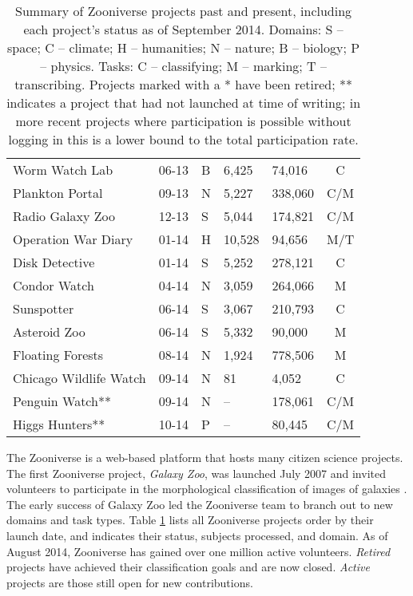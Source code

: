 \documentclass{sigchi}
\begin{document}
\begin{spacing}{0.97}
\begin{spacing}{0.8}
\begin{table}[t]
\begin{center}
\begin{tabular}{p{2.15cm}lp{0.7cm}llc}
Worm Watch Lab & 06-13 & B & 6,425 & 74,016 & C \\	
Plankton Portal & 09-13 & N & 5,227 & 338,060 & C/M \\
Radio Galaxy Zoo & 12-13 & S & 5,044 & 174,821 & C/M \\
\hline
Operation War Diary & 01-14 & H & 10,528 & 94,656 & M/T \\
Disk Detective & 01-14 & S & 5,252 & 278,121 & C \\
Condor Watch & 04-14 & N & 3,059 & 264,066 & M \\
Sunspotter & 06-14 & S & 3,067 & 210,793 & C \\
Asteroid Zoo & 06-14 & S & 5,332 & 90,000 & M \\
Floating Forests & 08-14 & N & 1,924 & 778,506 & M \\
Chicago Wildlife Watch & 09-14 & N & 81 & 4,052 & C \\
Penguin Watch** & 09-14 & N & -- & 178,061 & C/M \\
Higgs Hunters** & 10-14 & P & -- & 80,445 & C/M \\
\hline
\end{tabular}
\caption{Summary of Zooniverse projects past and present, including each project's status as of September 2014. Domains: S -- space; C -- climate; H -- humanities; N -- nature; B -- biology; P -- physics. Tasks: C -- classifying; M -- marking; T -- transcribing. Projects marked with a * have been retired; ** indicates a project that had not launched at time of writing; in more recent projects where participation is possible without logging in this is a lower bound to the total participation rate.}
\label{table:project-summary}
\normalsize
\end{center}
\end{table}
\end{spacing}

The Zooniverse is a web-based platform that hosts many citizen science projects. The first Zooniverse project, \emph{Galaxy Zoo}, was launched July 2007 and invited volunteers to participate in the morphological classification of images of galaxies \cite{lintott2008galaxy,fortson2011galaxy}. The early success of Galaxy Zoo led the Zooniverse team to branch out to new domains and task types. Table \ref{table:project-summary} lists all Zooniverse projects order by their launch date, and indicates their status, subjects processed, and domain. As of August 2014, Zooniverse has gained over one million active volunteers. \emph{Retired} projects have achieved their classification goals and are now closed. \emph{Active} projects are those still open for new contributions. 


\end{spacing}
\end{document}
